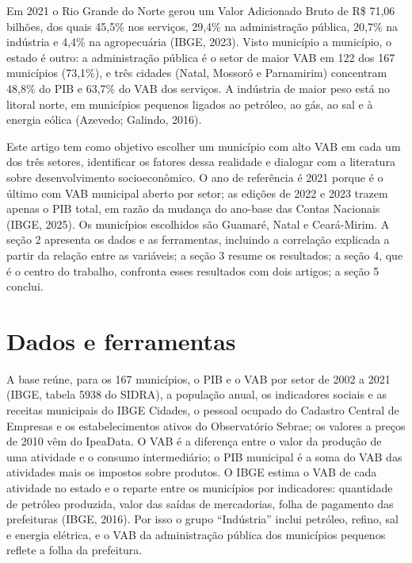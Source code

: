 \documentclass[12pt,a4paper]{article}
\begin{document}
Em 2021 o Rio Grande do Norte gerou um Valor Adicionado Bruto de R\$ 71,06 bilhões, dos quais 45,5\% nos serviços, 29,4\% na administração pública, 20,7\% na indústria e 4,4\% na agropecuária (IBGE, 2023). Visto município a município, o estado é outro: a administração pública é o setor de maior VAB em 122 dos 167 municípios (73,1\%), e três cidades (Natal, Mossoró e Parnamirim) concentram 48,8\% do PIB e 63,7\% do VAB dos serviços. A indústria de maior peso está no litoral norte, em municípios pequenos ligados ao petróleo, ao gás, ao sal e à energia eólica (Azevedo; Galindo, 2016).

Este artigo tem como objetivo escolher um município com alto VAB em cada um dos três setores, identificar os fatores dessa realidade e dialogar com a literatura sobre desenvolvimento socioeconômico. O ano de referência é 2021 porque é o último com VAB municipal aberto por setor; as edições de 2022 e 2023 trazem apenas o PIB total, em razão da mudança do ano-base das Contas Nacionais (IBGE, 2025). Os municípios escolhidos são Guamaré, Natal e Ceará-Mirim. A seção 2 apresenta os dados e as ferramentas, incluindo a correlação explicada a partir da relação entre as variáveis; a seção 3 resume os resultados; a seção 4, que é o centro do trabalho, confronta esses resultados com dois artigos; a seção 5 conclui.

\section{Dados e ferramentas}

A base reúne, para os 167 municípios, o PIB e o VAB por setor de 2002 a 2021 (IBGE, tabela 5938 do SIDRA), a população anual, os indicadores sociais e as receitas municipais do IBGE Cidades, o pessoal ocupado do Cadastro Central de Empresas e os estabelecimentos ativos do Observatório Sebrae; os valores a preços de 2010 vêm do IpeaData. O VAB é a diferença entre o valor da produção de uma atividade e o consumo intermediário; o PIB municipal é a soma do VAB das atividades mais os impostos sobre produtos. O IBGE estima o VAB de cada atividade no estado e o reparte entre os municípios por indicadores: quantidade de petróleo produzida, valor das saídas de mercadorias, folha de pagamento das prefeituras (IBGE, 2016). Por isso o grupo ``Indústria'' inclui petróleo, refino, sal e energia elétrica, e o VAB da administração pública dos municípios pequenos reflete a folha da prefeitura.
\end{document}
